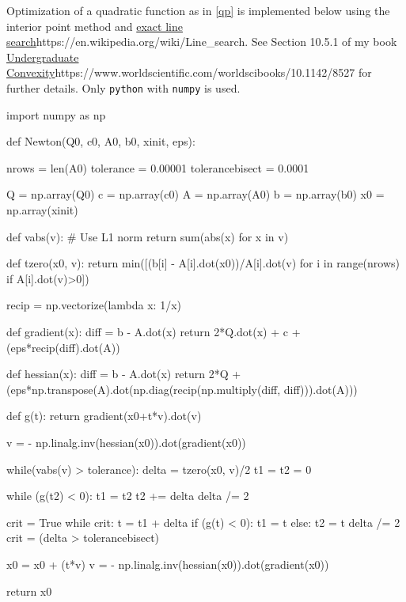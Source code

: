 \documentclass{article}
\begin{document}
Optimization of a quadratic function as in \eqref{qp} is implemented below using the
interior point method and \url{exact line search}{https://en.wikipedia.org/wiki/Line_search}. See Section 10.5.1 of my book \url{Undergraduate Convexity}{https://www.worldscientific.com/worldscibooks/10.1142/8527} for further details. Only
\texttt{python} with \texttt{numpy} is used.

\begin{sage}
import numpy as np

def Newton(Q0, c0, A0, b0, xinit, eps):

    nrows = len(A0)
    tolerance = 0.00001
    tolerancebisect = 0.0001

    
    Q = np.array(Q0)
    c = np.array(c0)
    A = np.array(A0)
    b = np.array(b0)
    x0 = np.array(xinit)

    def vabs(v): # Use L1 norm
      return sum(abs(x) for x in v)
    
    def tzero(x0, v):
        return min([(b[i] - A[i].dot(x0))/A[i].dot(v) for i in range(nrows) if A[i].dot(v)>0])

    recip = np.vectorize(lambda x: 1/x)
    
    def gradient(x):
      diff = b - A.dot(x)
      return 2*Q.dot(x) + c + (eps*recip(diff).dot(A))

    def hessian(x):
      diff = b - A.dot(x)
      return 2*Q + (eps*np.transpose(A).dot(np.diag(recip(np.multiply(diff, diff))).dot(A)))

    def g(t):
      return gradient(x0+t*v).dot(v)
  
    v = - np.linalg.inv(hessian(x0)).dot(gradient(x0))

    while(vabs(v) > tolerance):
        delta = tzero(x0, v)/2
        t1 = t2 = 0
        
        while (g(t2) < 0):
            t1 = t2
            t2 += delta
            delta /= 2

        crit = True
        while crit:
            t = t1 + delta
            if (g(t) < 0):
                t1 = t
            else:
                t2 = t
            delta /= 2
            crit = (delta > tolerancebisect) 
        
        x0 = x0 + (t*v)
        v = - np.linalg.inv(hessian(x0)).dot(gradient(x0))

    return x0


\end{sage}
\end{document}
